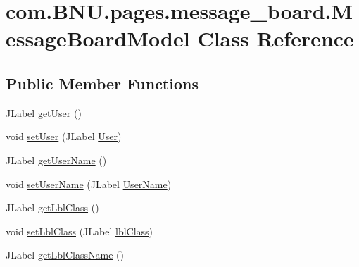 \hypertarget{classcom_1_1_b_n_u_1_1pages_1_1message__board_1_1_message_board_model}{}\section{com.\+B\+N\+U.\+pages.\+message\+\_\+board.\+Message\+Board\+Model Class Reference}
\label{classcom_1_1_b_n_u_1_1pages_1_1message__board_1_1_message_board_model}
\subsection*{Public Member Functions}
\begin{DoxyCompactItemize}
\item 
J\+Label \mbox{\hyperlink{classcom_1_1_b_n_u_1_1pages_1_1message__board_1_1_message_board_model_acb221df426219b0387384eb5d7cd680c}{get\+User}} ()
\item 
void \mbox{\hyperlink{classcom_1_1_b_n_u_1_1pages_1_1message__board_1_1_message_board_model_a94e9a8109e1a64ec9acd01becf35a70c}{set\+User}} (J\+Label \mbox{\hyperlink{classcom_1_1_b_n_u_1_1pages_1_1message__board_1_1_message_board_model_a977330a066ae90d6e1632302983f62d9}{User}})
\item 
J\+Label \mbox{\hyperlink{classcom_1_1_b_n_u_1_1pages_1_1message__board_1_1_message_board_model_a8ee3db34296468192f69cbd61c3cd5ce}{get\+User\+Name}} ()
\item 
void \mbox{\hyperlink{classcom_1_1_b_n_u_1_1pages_1_1message__board_1_1_message_board_model_ab96b567080960b87bca6a09396b5f354}{set\+User\+Name}} (J\+Label \mbox{\hyperlink{classcom_1_1_b_n_u_1_1pages_1_1message__board_1_1_message_board_model_abc45e716279bfb662f3b3062a6228cc8}{User\+Name}})
\item 
J\+Label \mbox{\hyperlink{classcom_1_1_b_n_u_1_1pages_1_1message__board_1_1_message_board_model_aa7571460407ca769fc90bcd91c1db871}{get\+Lbl\+Class}} ()
\item 
void \mbox{\hyperlink{classcom_1_1_b_n_u_1_1pages_1_1message__board_1_1_message_board_model_abfadfbb8fc8ade665590701f66db2072}{set\+Lbl\+Class}} (J\+Label \mbox{\hyperlink{classcom_1_1_b_n_u_1_1pages_1_1message__board_1_1_message_board_model_a1217afe189fdc82d451d24c0e70c714f}{lbl\+Class}})
\item 
J\+Label \mbox{\hyperlink{classcom_1_1_b_n_u_1_1pages_1_1message__board_1_1_message_board_model_afaa0247f9b08f1a877f03d7ecf967b57}{get\+Lbl\+Class\+Name}} ()

\end{DoxyCompactItemize}
